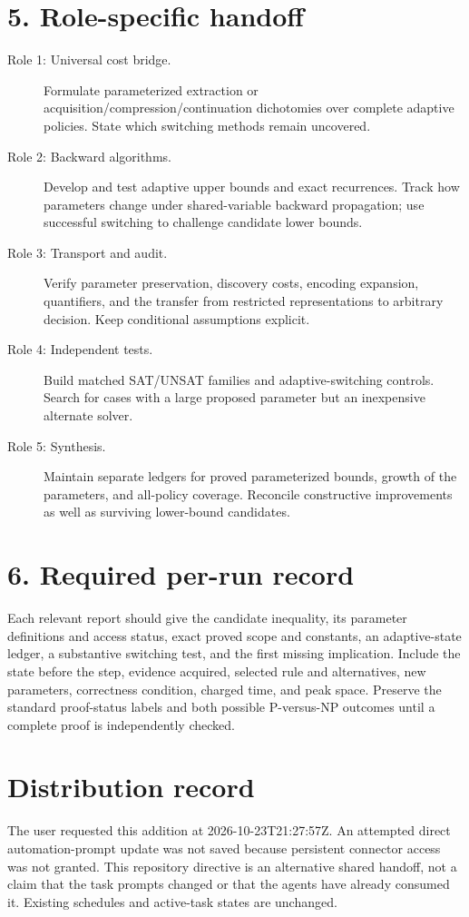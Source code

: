 \documentclass[11pt]{article}
\begin{document}
\section*{5. Role-specific handoff}
\begin{description}
\item[Role 1: Universal cost bridge.] Formulate parameterized extraction or acquisition/compression/continuation dichotomies over complete adaptive policies. State which switching methods remain uncovered.
\item[Role 2: Backward algorithms.] Develop and test adaptive upper bounds and exact recurrences. Track how parameters change under shared-variable backward propagation; use successful switching to challenge candidate lower bounds.
\item[Role 3: Transport and audit.] Verify parameter preservation, discovery costs, encoding expansion, quantifiers, and the transfer from restricted representations to arbitrary decision. Keep conditional assumptions explicit.
\item[Role 4: Independent tests.] Build matched SAT/UNSAT families and adaptive-switching controls. Search for cases with a large proposed parameter but an inexpensive alternate solver.
\item[Role 5: Synthesis.] Maintain separate ledgers for proved parameterized bounds, growth of the parameters, and all-policy coverage. Reconcile constructive improvements as well as surviving lower-bound candidates.
\end{description}

\section*{6. Required per-run record}
Each relevant report should give the candidate inequality, its parameter definitions and access status, exact proved scope and constants, an adaptive-state ledger, a substantive switching test, and the first missing implication. Include the state before the step, evidence acquired, selected rule and alternatives, new parameters, correctness condition, charged time, and peak space. Preserve the standard proof-status labels and both possible P-versus-NP outcomes until a complete proof is independently checked.

\section*{Distribution record}
The user requested this addition at 2026-10-23T21:27:57Z. An attempted direct automation-prompt update was not saved because persistent connector access was not granted. This repository directive is an alternative shared handoff, not a claim that the task prompts changed or that the agents have already consumed it. Existing schedules and active-task states are unchanged.
\end{document}

